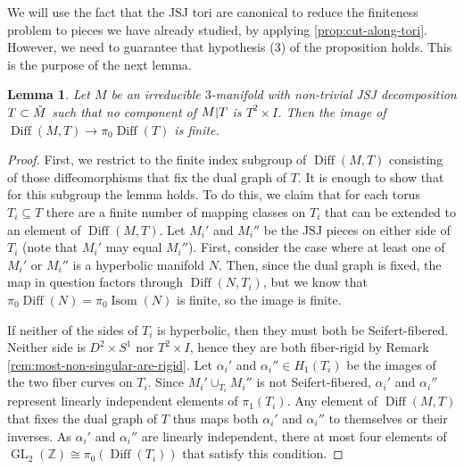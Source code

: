 \documentclass{amsart}
\theoremstyle{plain}
\newtheorem{lem}[thm]{Lemma}
\theoremstyle{definition}
\DeclareMathOperator\Diff{Diff}
\DeclareMathOperator\Isom{Isom}
\DeclareMathOperator\GL{GL}
\newcommand{\interior}[1]{\smash{\mathring{#1}}}
\newcommand{\ca}{\smash{\mid}} %
\newcommand{\Z}{\mathbb{Z}}
\begin{document}
We will use the fact that the JSJ tori are canonical to reduce the finiteness problem to pieces we have already studied, by applying \cref{prop:cut-along-tori}. However, we need to guarantee that hypothesis (3) of the proposition holds.  This is the purpose of the next lemma.


\begin{lem}\label{lem:JSJ-finite-MCG}
    Let $M$ be an irreducible $3$-manifold with non-trivial JSJ decomposition $T \subset \interior{M}$ such that no component of $M \ca T$ is $T^2 \times I$.
    Then the image of $\Diff(M, T) \to \pi_0 \Diff(T)$ is finite.
\end{lem}
\begin{proof}
    First, we restrict to the finite index subgroup of $\Diff(M,T)$ consisting of those diffeomorphisms that fix the dual graph of $T$. It is enough to show that for this subgroup the lemma holds. To do this, we claim that for each torus $T_i \subseteq T$ there are a finite number of mapping classes on $T_i$ that can be extended to an element of $\Diff(M, T)$. Let $M_i'$ and $M_i''$ be the JSJ pieces on either side of $T_i$ (note that $M_i'$ may equal $M_i''$).
    First, consider the case where at least one of $M_i'$ or $M_i''$ is a hyperbolic manifold $N$.
    Then, since the dual graph is fixed, the map in question factors through $\Diff(N, T_i)$, but we know that $\pi_0\Diff(N) = \pi_0 \Isom(N)$ is finite, so the image is finite.
    
    If neither of the sides of $T_i$ is hyperbolic, then they must both be Seifert-fibered. Neither side is $D^2\times S^1$  nor $T^2\times I$, hence they are both fiber-rigid by Remark \ref{rem:most-non-singular-are-rigid}. Let $\alpha_i'$ and $\alpha_i'' \in H_1(T_i)$ be the images of the two fiber curves  on $T_i$. Since $M_i'\cup_{T_i}M_i''$ is not Seifert-fibered, $\alpha_i'$ and $\alpha_i''$ represent linearly independent elements of $\pi_1(T_i)$. Any element of $\Diff(M,T)$ that fixes the dual graph of $T$ thus maps both $\alpha_i'$ and $\alpha_i''$ to themselves or their inverses. As $\alpha_i'$ and $\alpha_i''$ are linearly independent, there at most four elements of $\GL_2(\Z)\cong \pi_0(\Diff(T_i))$ that satisfy this condition.
\end{proof}
\end{document}
